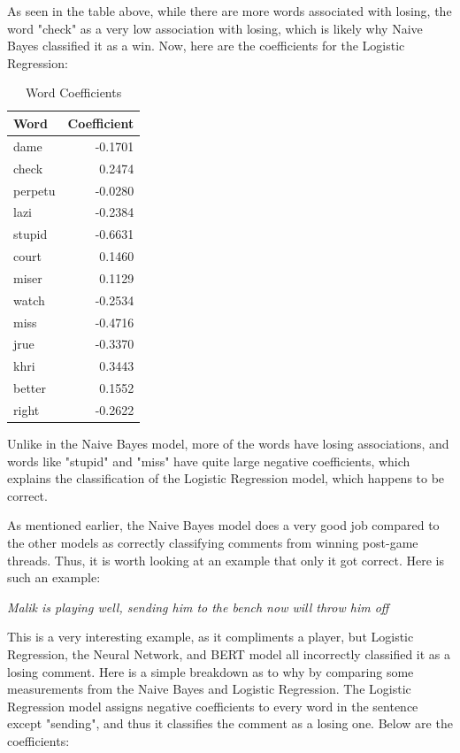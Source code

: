 \documentclass[twocolumn]{article}
\begin{document}
As seen in the table above, while there are more words associated with losing, the word "check" as a very low association with losing, which is likely why Naive Bayes classified it as a win. Now, here are the coefficients for the Logistic Regression:

\begin{table}[H]
\centering
\begin{tabular}{l r}
\hline
Word & Coefficient \\
\hline
dame & -0.1701 \\
check & 0.2474 \\
perpetu & -0.0280 \\
lazi & -0.2384 \\
stupid & -0.6631 \\
court & 0.1460 \\
miser & 0.1129 \\
watch & -0.2534 \\
miss & -0.4716 \\
jrue & -0.3370 \\
khri & 0.3443 \\
better & 0.1552 \\
right & -0.2622 \\
\hline
\end{tabular}
\caption{Word Coefficients}
\label{tab:word_coefficients}
\end{table}

Unlike in the Naive Bayes model, more of the words have losing associations, and words like "stupid" and "miss" have quite large negative coefficients, which explains the classification of the Logistic Regression model, which happens to be correct.

As mentioned earlier, the Naive Bayes model does a very good job compared to the other models as correctly classifying comments from winning post-game threads. Thus, it is worth looking at an example that only it got correct. Here is such an example:

\begin{center}
\textit{Malik is playing well, sending him to the bench now will throw him off}
\end{center}

This is a very interesting example, as it compliments a player, but Logistic Regression, the Neural Network, and BERT model all incorrectly classified it as a losing comment. Here is a simple breakdown as to why by comparing some measurements from the Naive Bayes and Logistic Regression. The Logistic Regression model assigns negative coefficients to every word in the sentence except "sending", and thus it classifies the comment as a losing one. Below are the coefficients:
\end{document}
